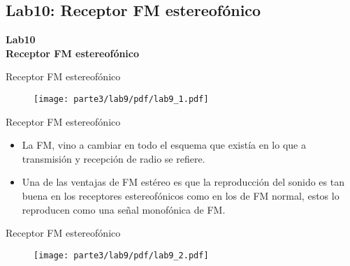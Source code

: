 \subsection{Lab10: Receptor FM estereofónico}
\begin{frame}{}


\bfseries{\textrm{\LARGE Lab10\\ \Large Receptor FM estereofónico}}
\raggedright
\end{frame}

\begin{frame}{Receptor FM estereofónico}


\begin{figure}[H]
\centering
\vspace{-3mm}
\texttt{[image: parte3/lab9/pdf/lab9\_1.pdf]}
\end{figure}

\end{frame}

\begin{frame}{Receptor FM estereofónico}

\begin{itemize}
    \item {La FM, vino a cambiar en todo el esquema que existía en lo que a transmisión y recepción de radio se refiere.}
    \item {Una de las ventajas de FM estéreo es que la reproducción del sonido es tan buena en los receptores estereofónicos como en los de FM normal, estos lo reproducen como una señal monofónica de FM.}
\end{itemize}

\end{frame}

\begin{frame}{Receptor FM estereofónico}

\begin{figure}[H]
\centering
\vspace{-3mm}
\texttt{[image: parte3/lab9/pdf/lab9\_2.pdf]}
\end{figure}

\end{frame}

